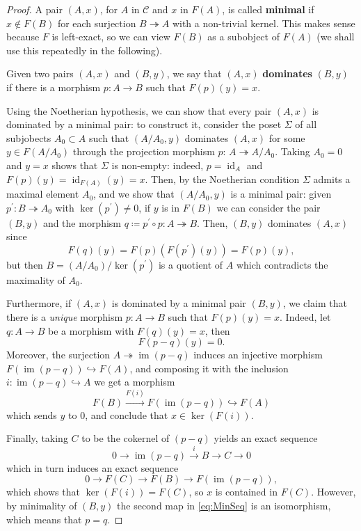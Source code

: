 \documentclass[a4paper, oneside]{memoir}
\renewcommand{\Im}{\operatorname{im}}
\theoremstyle{plain}
\theoremstyle{definition}
\theoremstyle{remark}
\begin{document}
\begin{proof}
    A pair \((A,x)\), for \(A\) in \(\mathcal{C}\) and \(x\) in \(F(A)\), is called
    \textbf{minimal} if \(x\notin F(B)\) for each surjection \(B\twoheadrightarrow A\) with a non-trivial kernel. This makes sense because \(F\) is left-exact, so we can view \(F(B)\) as a subobject of \(F(A)\) (we shall use this repeatedly in the following).

    Given two pairs \((A,x)\) and \((B,y)\), we say that \((A,x)\) \textbf{dominates} \((B,y)\) if there is a morphism \(p:A\to B\) such that \(F(p)(y)=x\).

    Using the Noetherian hypothesis, we can show that every pair \((A,x)\) is dominated by a minimal pair: to construct it, consider the poset \(\Sigma\) of all subjobects \(A_0 \subset A\) such that \((A/A_0,y)\) dominates \((A,x)\) for some \(y\in F(A/A_0)\)  through the projection morphism \(p:\,A\twoheadrightarrow A/A_0\).
    Taking \(A_0=0\) and \(y=x\) shows that \(\Sigma\) is non-empty: indeed, \(p=\operatorname{id}_A\) and \(F(p)(y)=\operatorname{id}_{F(A)}(y)=x\). Then, by the Noetherian condition \(\Sigma\) admits a maximal element \(A_0\), and we show that \((A/A_0,y)\) is a minimal pair: given \(p^{\prime} :B\twoheadrightarrow A_0\) with \(\ker(p^{\prime})\neq 0\), if \(y\) is in \(F(B)\) we can consider the pair \((B,y)\) and the morphism \(q\coloneqq p^{\prime} \circ p: A\twoheadrightarrow B\). Then, \((B,y)\) dominates \((A,x)\) since
    \[F(q)(y)=F(p)(F(p^{\prime} )(y))=F(p)(y),\]  but then \(B= (A/A_0)/\ker(p^{\prime})\) is a quotient of \(A\) which contradicts the maximality of \(A_0\).

    Furthermore, if \((A,x)\) is dominated by a minimal pair \((B,y)\), we claim that there is a \textit{unique} morphism \(p:A\to B\) such that \(F(p)(y)=x\).
    Indeed, let \(q:A\to B\) be a morphism with \(F(q)(y)=x\), then \[F(p-q)(y)= 0.\]
    Moreover, the surjection \(A\twoheadrightarrow\Im(p-q)\) induces an injective morphism \(F(\Im(p-q))\hookrightarrow F(A)\), and composing it with the inclusion \(i: \Im(p-q)\hookrightarrow A\) we get a morphism \[F(B)\overset{F(i)}{\to} F(\Im(p-q))\hookrightarrow F(A)\] which sends \(y\) to \(0\), and conclude that \(x\in\ker(F(i))\).

    Finally, taking \(C\) to be the cokernel of \((p-q)\) yields an exact sequence
    \begin{equation}\label{eq:MinSeq}
        0\to\Im(p-q)\overset{i}{\to} B\to C\to 0
    \end{equation}
    which in turn induces an exact sequence
    \[0\to F(C)\to F(B) \to F(\Im(p-q)),\]
    which shows that \(\ker(F(i))=F(C)\), so \(x\) is contained in \(F(C)\). However, by minimality of \((B,y)\) the second
    map in \eqref{eq:MinSeq} is an isomorphism, which means that \(p=q\).


\end{proof}
\end{document}
